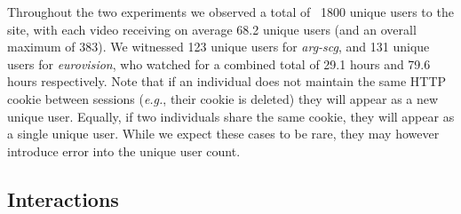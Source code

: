 \documentclass[a4paper,11pt]{article}
\begin{document}

Throughout the two experiments we observed a total of ~1800 unique users to the site, with each video receiving on average 68.2 unique users (and an overall maximum of 383). We witnessed 123 unique users for \emph{arg-scg}, and 131 unique users for \emph{eurovision}, who watched for a combined total of 29.1 hours and 79.6 hours respectively. Note that if an individual does not maintain the same HTTP cookie between sessions (\emph{e.g.}, their cookie is deleted) they will appear as a new unique user. Equally, if two individuals share the same cookie, they will appear as a single unique user. While we expect these cases to be rare, they may however introduce error into the unique user count.

\subsection{Interactions}
\label{sect:interactions}

\end{document}
